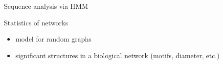 \documentclass[pdf,mia,noFooter,slideColor,colorBG]{prosper}
\begin{document}
\begin{slide}{Sequence analysis via HMM}


\end{slide}


\begin{slide}{Statistics of networks}

\begin{itemize}
\item model for random graphs

\item significant structures in a biological network (motifs,
  diameter, etc.)

\end{itemize}


\end{slide}
\end{document}
